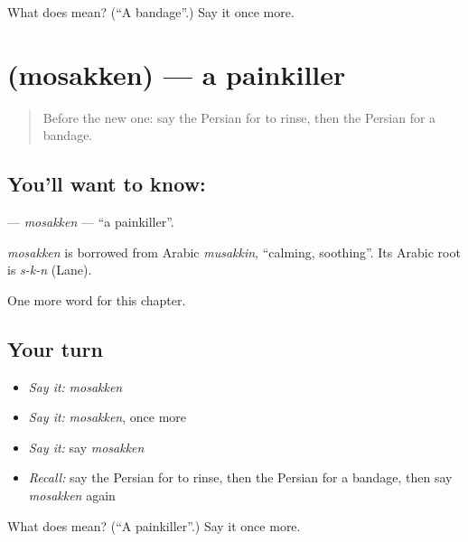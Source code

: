 \begin{tcolorbox}[breakable,colback=teal!4,colframe=teal!35!black,title={Before you move on}]
What does  mean? (\textquotedblleft{}A bandage\textquotedblright{}.) Say it once more.
\end{tcolorbox}
\section[\texorpdfstring{\fa{مسکن} (mosakken)}{مسکن (mosakken)}]{ (mosakken) — a painkiller}

\label{lesson:FA-C227-mosakken}



\begin{quote}
Before the new one: say the Persian for to rinse, then the Persian for a bandage.
\end{quote}

\subsection*{You'll want to know: }
\textbf{} — \emph{mosakken} — \textquotedblleft{}a painkiller\textquotedblright{}.

\begin{cousinweb}
\emph{mosakken} is borrowed from Arabic \emph{musakkin}, \textquotedblleft{}calming, soothing\textquotedblright{}. Its Arabic root is \emph{s-k-n} (Lane).
\end{cousinweb}

\begin{grammarlens}[title={What you've built}]
One more word for this chapter.
\end{grammarlens}

\subsection*{Your turn}
\begin{itemize}
\raggedright
  \item \emph{Say it:} \emph{mosakken}
  \item \emph{Say it:} \emph{mosakken}, once more
  \item \emph{Say it:} say \emph{mosakken}
  \item \emph{Recall:} say the Persian for to rinse, then the Persian for a bandage, then say \emph{mosakken} again
\end{itemize}

\begin{tcolorbox}[breakable,colback=teal!4,colframe=teal!35!black,title={Before you move on}]
What does  mean? (\textquotedblleft{}A painkiller\textquotedblright{}.) Say it once more.
\end{tcolorbox}

